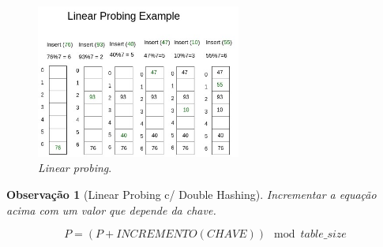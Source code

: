 \documentclass[a4paper, 12pt]{article}
\newtheorem{remark}{Observação}
\begin{document}
\begin{figure}[H]
    \centering
    \includegraphics[width=0.6\textwidth]{fig/hash/Linear-Probing-1-1.jpg}
    \caption{\emph{Linear probing}.}
\end{figure}

\begin{remark}[Linear Probing c/ Double Hashing]
Incrementar a equação acima com um valor que depende da chave.
\end{remark}

\begin{equation}
    P=(P+INCREMENTO(CHAVE)) \mod table\_size
\end{equation}
\end{document}

